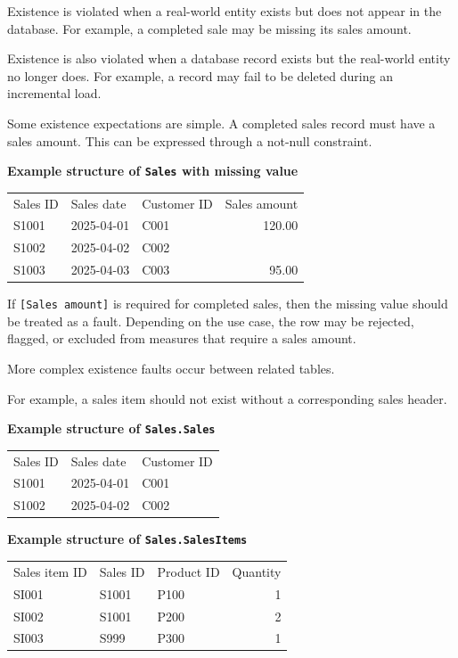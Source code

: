 \documentclass[10pt,openany,10pt]{book}
\newcounter{none}
\let\podeToprule\toprule
\let\podeMidrule\midrule
\let\podeBottomrule\bottomrule
\renewcommand{\toprule}{\arrayrulecolor{pbiGrid}\podeToprule}
\renewcommand{\midrule}{\arrayrulecolor{pbiGrid}\podeMidrule}
\renewcommand{\bottomrule}{\arrayrulecolor{pbiGrid}\podeBottomrule}
\begin{document}
Existence is violated when a real-world entity exists but does not
appear in the database. For example, a completed sale may be missing its
sales amount.

Existence is also violated when a database record exists but the
real-world entity no longer does. For example, a record may fail to be
deleted during an incremental load.

Some existence expectations are simple. A completed sales record must
have a sales amount. This can be expressed through a not-null
constraint.

\textbf{Example structure of
\texttt{\textquotesingle{}Sales\textquotesingle{}} with missing value}

{\def\LTcaptype{none} %
\begin{longtable}[]{@{}lllr@{}}
\toprule\noalign{}
Sales ID & Sales date & Customer ID & Sales amount \\
\midrule\noalign{}
\endhead
\bottomrule\noalign{}
\endlastfoot
S1001 & 2025-04-01 & C001 & 120.00 \\
S1002 & 2025-04-02 & C002 & \\
S1003 & 2025-04-03 & C003 & 95.00 \\
\end{longtable}
}

If \texttt{{[}Sales\ amount{]}} is required for completed sales, then
the missing value should be treated as a fault. Depending on the use
case, the row may be rejected, flagged, or excluded from measures that
require a sales amount.

More complex existence faults occur between related tables.

For example, a sales item should not exist without a corresponding sales
header.

\textbf{Example structure of \texttt{Sales.Sales}}

{\def\LTcaptype{none} %
\begin{longtable}[]{@{}lll@{}}
\toprule\noalign{}
Sales ID & Sales date & Customer ID \\
\midrule\noalign{}
\endhead
\bottomrule\noalign{}
\endlastfoot
S1001 & 2025-04-01 & C001 \\
S1002 & 2025-04-02 & C002 \\
\end{longtable}
}

\textbf{Example structure of \texttt{Sales.SalesItems}}

{\def\LTcaptype{none} %
\begin{longtable}[]{@{}lllr@{}}
\toprule\noalign{}
Sales item ID & Sales ID & Product ID & Quantity \\
\midrule\noalign{}
\endhead
\bottomrule\noalign{}
\endlastfoot
SI001 & S1001 & P100 & 1 \\
SI002 & S1001 & P200 & 2 \\
SI003 & S999 & P300 & 1 \\
\end{longtable}
}
\end{document}
